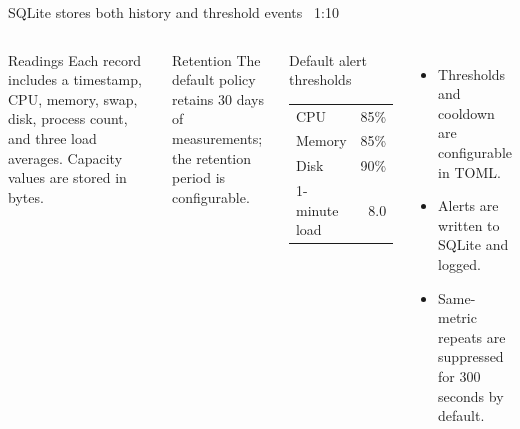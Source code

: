 \documentclass[aspectratio=169,10pt]{beamer}
\newcommand{\slidepace}[1]{\hfill{\scriptsize\color{TBLMuted}#1}}
\begin{document}
\begin{frame}{SQLite stores both history and threshold events}
\slidepace{~1:10}
\begin{columns}[T,onlytextwidth]
    \begin{block}{Readings}
      Each record includes a timestamp, CPU, memory, swap, disk, process count, and three load averages. Capacity values are stored in bytes.
    \end{block}
    \begin{block}{Retention}
      The default policy retains 30 days of measurements; the retention period is configurable.
    \end{block}
    \begin{block}{Default alert thresholds}
      \begin{tabular}{@{}lr@{}}
        CPU & 85\% \\
        Memory & 85\% \\
        Disk & 90\% \\
        1-minute load & 8.0 \\
      \end{tabular}
    \end{block}
    \begin{itemize}
      \item Thresholds and cooldown are configurable in TOML.
      \item Alerts are written to SQLite and logged.
      \item Same-metric repeats are suppressed for 300 seconds by default.
    \end{itemize}
\end{columns}
\end{frame}
\end{document}
